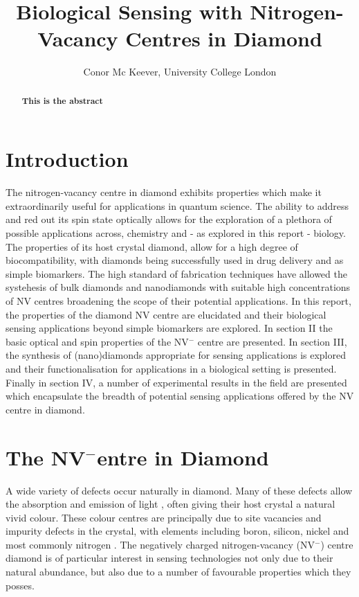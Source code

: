 \documentclass[10pt]{article}
\title{\LARGE Biological Sensing with Nitrogen-Vacancy Centres in Diamond}
\date{}
\author{\vspace{3mm}
\large Conor Mc Keever, University College London
}
\makeatletter
\renewcommand{\maketitle}{\bgroup\setlength{\parindent}{0pt}
\begin{flushleft}
  \textbf{\@title}

  \@author
\end{flushleft}\egroup
}
\makeatother
\begin{document}
\maketitle
\vspace{0.4cm}

\begin{abstract}
\textbf{This is the abstract}
\end{abstract}


\begin{multicols}{2}
\normalsize
\tableofcontents
\section{Introduction}
The nitrogen-vacancy centre in diamond exhibits properties which make it extraordinarily useful for applications in quantum science. The ability to address and red out its spin state optically allows for the exploration of a plethora of possible applications across, chemistry and - as explored in this report - biology. The properties of its host crystal diamond, allow for a high degree of biocompatibility, with diamonds being successfully used in drug delivery and as simple biomarkers. The high standard of fabrication techniques have allowed the systehesis of bulk diamonds and nanodiamonds with suitable high concentrations of NV centres broadening the scope of their potential applications. In this report, the properties of the diamond NV centre are elucidated and their biological sensing applications beyond simple biomarkers are explored. In section II the basic optical and spin properties of the NV$^-$ centre are presented. In section III, the synthesis of (nano)diamonds appropriate for sensing applications is explored and their functionalisation for applications in a biological setting is presented. Finally in section IV, a number of experimental results in the field are presented which encapsulate the breadth of potential sensing applications offered by the NV centre in diamond.

\section{The NV\texorpdfstring{$^-$} Centre in Diamond}
A wide variety of defects occur naturally in diamond. Many of these defects allow the absorption and emission of light \cite{zaitsev2001optical}, often giving their host crystal a natural vivid colour. These colour centres are principally due to site vacancies and impurity defects in the crystal, with elements including boron, silicon, nickel and most commonly nitrogen \cite{wu2016diamond}. The negatively charged nitrogen-vacancy (NV$^-$) centre diamond is of particular interest in sensing technologies not only due to their natural abundance, but also due to a number of favourable properties which they posses. 


\end{multicols}
\end{document}
